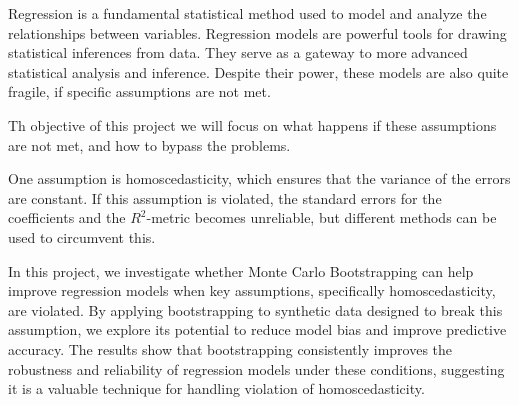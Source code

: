 Regression is a fundamental statistical method used to model and analyze the relationships between variables. Regression models are powerful tools for drawing statistical inferences from data. They serve as a gateway to more advanced statistical analysis and inference. Despite their power, these models are also quite fragile, if specific assumptions are not met.

Th objective of this project we will focus on what happens if these assumptions are not met, and how to bypass the problems.

One assumption is homoscedasticity, which ensures that the variance of the errors are constant. If this assumption is violated, the standard errors for the coefficients and the $R^2$-metric becomes unreliable, but different methods can be used to circumvent this. 


In this project, we investigate whether Monte Carlo Bootstrapping can help improve regression models when key assumptions, specifically homoscedasticity, are violated. By applying bootstrapping to synthetic data designed to break this assumption, we explore its potential to reduce model bias and improve predictive accuracy.
  The results show that bootstrapping consistently improves the robustness and reliability of regression models under these conditions, suggesting it is a valuable technique for handling  violation of homoscedasticity.